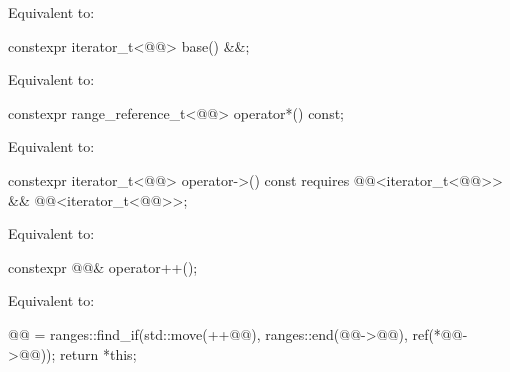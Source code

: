\begin{itemdescr}
\pnum
\effects
Equivalent to: 
\end{itemdescr}

%
\begin{itemdecl}
constexpr iterator_t<@@> base() &&;
\end{itemdecl}

\begin{itemdescr}
\pnum
\effects
Equivalent to: 
\end{itemdescr}

%
\begin{itemdecl}
constexpr range_reference_t<@@> operator*() const;
\end{itemdecl}

\begin{itemdescr}
\pnum
\effects
Equivalent to: 
\end{itemdescr}

%
\begin{itemdecl}
constexpr iterator_t<@@> operator->() const
  requires @@<iterator_t<@@>> && @@<iterator_t<@@>>;
\end{itemdecl}

\begin{itemdescr}
\pnum
\effects
Equivalent to: 
\end{itemdescr}

%
\begin{itemdecl}
constexpr @@& operator++();
\end{itemdecl}

\begin{itemdescr}
\pnum
\effects
Equivalent to:
\begin{codeblock}
@@ = ranges::find_if(std::move(++@@), ranges::end(@@->@@),
                           ref(*@@->@@));
return *this;
\end{codeblock}
\end{itemdescr}

